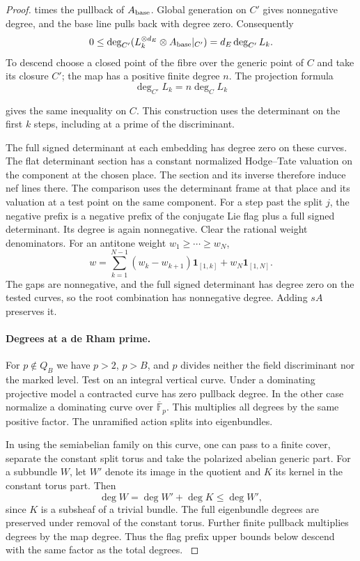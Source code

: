 \begin{proof}
times the pullback of \(A_{\rm base}\). Global generation on \(C'\) gives nonnegative degree, and the
base line pulls back with degree zero. Consequently
\[
 0\le\deg_{C'}(L_k^{\otimes d_E}\otimes A_{\rm base}|_{C'})
    =d_E\deg_{C'}L_k .
\] To descend choose a closed
point of the fibre over the generic point of \(C\) and take
its closure \(C'\); the map has a positive finite degree
\(n\). The projection formula
\[
 \deg_{C'}L_k=n\deg_C L_k
\]

gives the same inequality on \(C\). This construction uses the determinant on the first \(k\)
steps, including at a prime of the discriminant.
\label{cor:flag-wall-positivity-4}

The full signed determinant at each embedding has degree zero on
these curves. The flat determinant section has a constant normalized
Hodge--Tate valuation on the component at the chosen place. The
section and its inverse therefore induce nef lines there. The
comparison uses the determinant frame at that place and its
valuation at a test point on the same component. For a step past
the split \(j\), the negative prefix is a negative prefix of the
conjugate Lie flag plus a full signed determinant. Its degree is
again nonnegative. Clear the rational weight denominators.
For an antitone weight \(w_1\ge\cdots\ge w_N\),
\[
 w=\sum_{k=1}^{N-1}(w_k-w_{k+1})\mathbf1_{[1,k]}
                         +w_N\mathbf1_{[1,N]}.
\]
The gaps are nonnegative, and the full signed determinant
has degree zero on the tested curves, so the root combination
has nonnegative degree. Adding \(sA\) preserves it. \label{cor:flag-wall-positivity-5}

\paragraph{Degrees at a de Rham prime.}
For \(p\notin Q_B\) we have \(p>2\), \(p>B\), and \(p\) divides
neither the field discriminant nor the marked level. Test on an
integral vertical curve. Under a dominating projective model a
contracted curve has zero pullback degree. In the other case
normalize a dominating curve over \(\overline{\mathbb F}_p\).
This multiplies all degrees by the same positive factor. The
unramified action splits into eigenbundles.

In using the semiabelian
family on this curve, one can pass to a finite cover, separate the
constant split torus and take the polarized abelian generic part.
For a subbundle \(W\), let \(W'\) denote its image in the quotient and \(K\) its kernel in the constant torus part. Then
\[
 \deg W=\deg W'+\deg K\le\deg W',
\]
since \(K\) is a subsheaf of a trivial bundle.
The full eigenbundle degrees are preserved under removal of the
constant torus. Further finite pullback multiplies degrees by
the map degree. Thus the flag prefix upper bounds below descend
with the same factor as the total degrees.
\label{cor:flag-wall-positivity-6}


\end{proof}
